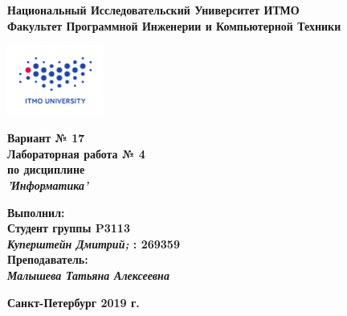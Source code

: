 \documentclass[11pt]{article}
\author{АВТОР}
\date{\today}
\title{}
\begin{document}
\begin{center}
\textbf{Национальный Исследовательский Университет ИТМО}\\
\textbf{Факультет Программной Инженерии и Компьютерной Техники}\\
\end{center}
\vspace{2em}
\begin{center}
\includegraphics[width=120px]{../../../itmo-logo.png}
\end{center}
\LARGE
\vspace{5em}
\begin{center}
\textbf{Вариант № 17}\\
\textbf{Лабораторная работа № 4}\\
\Large
\textbf{по дисциплине}\\
\LARGE
\textbf{\emph{'Информатика'}}\\
\end{center}
\vspace{11em}
\large
\begin{flushright}
\textbf{Выполнил:}\\
\textbf{Студент группы P3113}\\
\textbf{\emph{Куперштейн Дмитрий;} : 269359}\\
\textbf{Преподаватель:}\\
\textbf{\emph{Малышева Татьяна Алексеевна}}\\
\end{flushright}
\vspace{4em}
\large
\begin{center}
\textbf{Санкт-Петербург 2019 г.}
\end{center}
\pagebreak{}
\setcounter{tocdepth}{2}
\tableofcontents
\vspace{2em}
\pagebreak
\large
\end{document}
